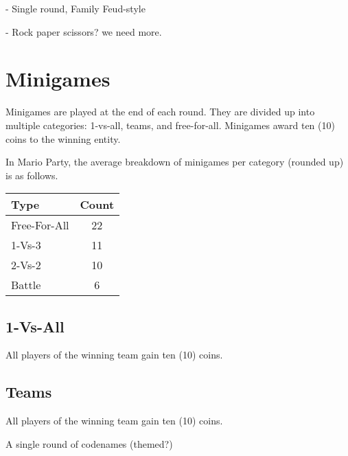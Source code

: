 \documentclass{article}
\begin{document}
\begin{description}[style=nextline]
\item[Mario Feud] - Single round, Family Feud-style
\item[...] - Rock paper scissors? we need more.
\end{description}

\section{Minigames}

Minigames are played at the end of each round.  They are divided up into multiple
categories: 1-vs-all, teams, and free-for-all.  Minigames award ten (10) coins
to the winning entity.
\vspace*{2ex}

\noindent
In Mario Party, the average breakdown of minigames per category (rounded up) is as follows.
\vspace*{2ex}

\begin{tabular}{l|c}
\textbf{Type} & \textbf{Count} \\
\hline
Free-For-All & 22 \\
1-Vs-3 & 11 \\
2-Vs-2 & 10 \\
Battle & 6 \\
\end{tabular}

\subsection{1-Vs-All}

All players of the winning team gain ten (10) coins.

\begin{description}[style=nextline]
\item[...]
\end{description}

\subsection{Teams}

All players of the winning team gain ten (10) coins.

\begin{description}[style=nextline]
\item[Codenames] A single round of codenames (themed?)
\item[...]
\end{description}
\end{document}
